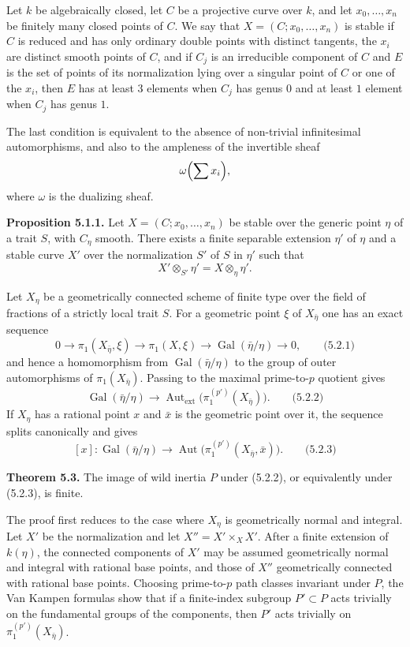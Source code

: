 \documentclass[11pt]{article}
\providecommand{\Gal}{\operatorname{Gal}}
\providecommand{\Aut}{\operatorname{Aut}}
\begin{document}
Let $k$ be algebraically closed, let $C$ be a projective curve over $k$, and let $x_0,\ldots,x_n$ be finitely many closed points of $C$. We say that $X=(C;x_0,\ldots,x_n)$ is stable if $C$ is reduced and has only ordinary double points with distinct tangents, the $x_i$ are distinct smooth points of $C$, and if $C_j$ is an irreducible component of $C$ and $E$ is the set of points of its normalization lying over a singular point of $C$ or one of the $x_i$, then $E$ has at least $3$ elements when $C_j$ has genus $0$ and at least $1$ element when $C_j$ has genus $1$.

The last condition is equivalent to the absence of non-trivial infinitesimal automorphisms, and also to the ampleness of the invertible sheaf
\[
 \omega\Bigl(\sum x_i\Bigr),
\]
where $\omega$ is the dualizing sheaf.

\textbf{Proposition 5.1.1.} Let $X=(C;x_0,\ldots,x_n)$ be stable over the generic point $\eta$ of a trait $S$, with $C_\eta$ smooth. There exists a finite separable extension $\eta'$ of $\eta$ and a stable curve $X'$ over the normalization $S'$ of $S$ in $\eta'$ such that
\[
 X'\otimes_{S'}\eta'=X\otimes_\eta\eta'.
\]

Let $X_\eta$ be a geometrically connected scheme of finite type over the field of fractions of a strictly local trait $S$. For a geometric point $\xi$ of $X_{\bar\eta}$ one has an exact sequence
\[
0\to \pi_1(X_{\bar\eta},\xi)\to \pi_1(X,\xi)\to\Gal(\bar\eta/\eta)\to0,
\qquad\text{(5.2.1)}
\]
and hence a homomorphism from $\Gal(\bar\eta/\eta)$ to the group of outer automorphisms of $\pi_1(X_{\bar\eta})$. Passing to the maximal prime-to-$p$ quotient gives
\[
\Gal(\bar\eta/\eta)\to \Aut_{\mathrm{ext}}\bigl(\pi_1^{(p')}(X_{\bar\eta})\bigr).
\qquad\text{(5.2.2)}
\]
If $X_\eta$ has a rational point $x$ and $\bar x$ is the geometric point over it, the sequence splits canonically and gives
\[
[x]:\Gal(\bar\eta/\eta)\to \Aut\bigl(\pi_1^{(p')}(X_{\bar\eta},\bar x)\bigr).
\qquad\text{(5.2.3)}
\]

\textbf{Theorem 5.3.} The image of wild inertia $P$ under (5.2.2), or equivalently under (5.2.3), is finite.

The proof first reduces to the case where $X_\eta$ is geometrically normal and integral. Let $X'$ be the normalization and let $X''=X'\times_X X'$. After a finite extension of $k(\eta)$, the connected components of $X'$ may be assumed geometrically normal and integral with rational base points, and those of $X''$ geometrically connected with rational base points. Choosing prime-to-$p$ path classes invariant under $P$, the Van Kampen formulas show that if a finite-index subgroup $P'\subset P$ acts trivially on the fundamental groups of the components, then $P'$ acts trivially on $\pi_1^{(p')}(X_{\bar\eta})$.
\end{document}
